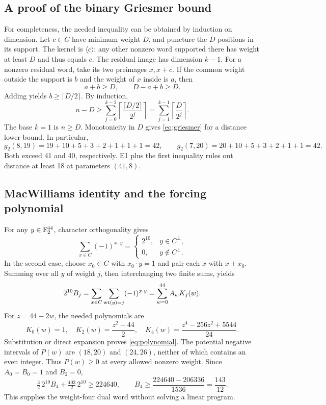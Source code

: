 \subsection{A proof of the binary Griesmer bound}
For completeness, the needed inequality can be obtained by induction on dimension. Let $c\in C$ have minimum weight $D$, and puncture the $D$ positions in its support. The kernel is $\langle c\rangle$: any other nonzero word supported there has weight at least $D$ and thus equals $c$. The residual image has dimension $k-1$. For a nonzero residual word, take its two preimages $x,x+c$. If the common weight outside the support is $b$ and the weight of $x$ inside is $a$, then
\[
 a+b\ge D,\qquad D-a+b\ge D.
\]
Adding yields $b\ge\lceil D/2\rceil$. By induction,
\[
 n-D\ge\sum_{j=0}^{k-2}\left\lceil\frac{\lceil D/2\rceil}{2^j}\right\rceil
       =\sum_{j=1}^{k-1}\left\lceil\frac D{2^j}\right\rceil.
\]
The base $k=1$ is $n\ge D$. Monotonicity in $D$ gives \eqref{eq:griesmer} for a distance lower bound. In particular,
\[
 g_2(8,19)=19+10+5+3+2+1+1+1=42,
 \qquad g_2(7,20)=20+10+5+3+2+1+1=42.
\]
Both exceed 41 and 40, respectively. E1 plus the first inequality rules out distance at least 18 at parameters $(41,8)$.

\subsection{MacWilliams identity and the forcing polynomial}
For any $y\in\mathbb F_2^{44}$, character orthogonality gives
\[
 \sum_{x\in C}(-1)^{x\cdot y}=
 \begin{cases}2^{10},&y\in C^\perp,\\0,&y\notin C^\perp.\end{cases}
\]
In the second case, choose $x_0\in C$ with $x_0\cdot y=1$ and pair each $x$ with $x+x_0$. Summing over all $y$ of weight $j$, then interchanging two finite sums, yields
\[
 2^{10}B_j=\sum_{x\in C}\sum_{\operatorname{wt}(y)=j}(-1)^{x\cdot y}
 =\sum_{w=0}^{44} A_wK_j(w).
\]
For $z=44-2w$, the needed polynomials are
\[
 K_0(w)=1,\quad K_2(w)=\frac{z^2-44}{2},\quad
 K_4(w)=\frac{z^4-256z^2+5544}{24}.
\]
Substitution or direct expansion proves \eqref{eq:polynomial}. The potential negative intervals of $P(w)$ are $(18,20)$ and $(24,26)$, neither of which contains an even integer. Thus $P(w)\ge0$ at every allowed nonzero weight. Since $A_0=B_0=1$ and $B_2=0$,
\[
 \tfrac32\,2^{10}B_4+\tfrac{403}{2}\,2^{10}\ge224640,
 \qquad B_4\ge\frac{224640-206336}{1536}=\frac{143}{12}.
\]
This supplies the weight-four dual word without solving a linear program.

